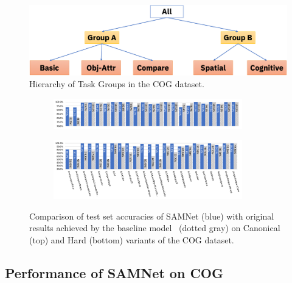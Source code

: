 \begin{figure}[htb]
	\centering
	\includegraphics[width=\columnwidth]{../img/architecture/hierarchy}
	\caption{Hierarchy of Task Groups in the COG dataset.}
	\label{fig:task-groups}
\end{figure}

\begin{figure}[htbp]
	\centering
	\begin{subfigure}{\textwidth}
		\centering
		\includegraphics[width=0.9\textwidth]{../results/samnet_cog_orig_canonical_no_labels.pdf}
	\end{subfigure}%
	\newline
	\begin{subfigure}{\textwidth}
		\centering
		\includegraphics[width=0.9\textwidth]{../results/samnet_cog_orig_hard.pdf}
	\end{subfigure}%
	\caption{Comparison of test set accuracies of SAMNet (blue) with original results achieved by the baseline model~\cite{yang2018dataset} (dotted gray) on Canonical (top) and Hard (bottom) variants of the COG dataset.}
	\label{fig:samnet_cog_detailed}
\end{figure}


\subsection{Performance of SAMNet on COG}
\label{sec:cog-baseline-compare}



